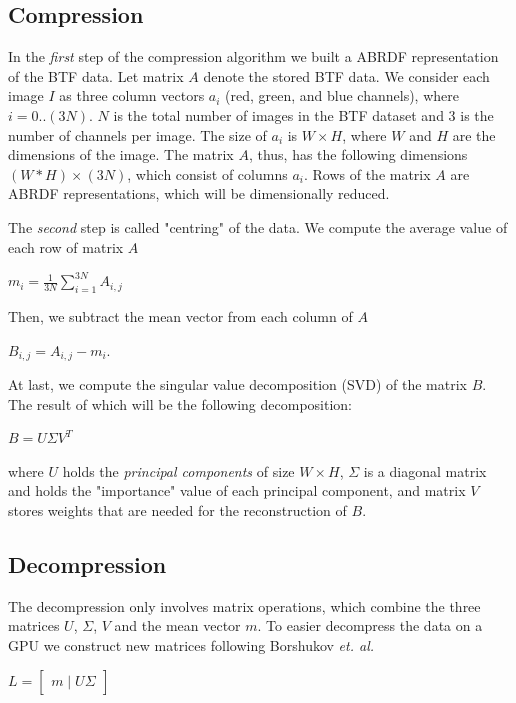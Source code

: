 \subsection{Compression}
\label{section:compression}
In the \emph{first} step of the compression algorithm we built a ABRDF representation of the BTF data.
Let matrix $A$ denote the stored BTF data.
We consider each image $I$ as three column vectors $a_{i}$ (red, green, and blue channels), where $i=0..(3N)$. $N$ is the total number of images in the BTF dataset and 3 is the number of channels per image.
The size of $a_{i}$ is $W\times H$, where $W$ and $H$ are the dimensions of the image.
The matrix $A$, thus, has the following dimensions $(W*H)\times(3N)$, which consist of columns $a_{i}$.
Rows of the matrix $A$ are ABRDF representations, which will be dimensionally reduced.

The  \emph{second} step is called "centring" of the data. We compute the average value of each row of matrix $A$

{\centering $m_i=\frac{1}{3N}\sum_{i=1}^{3N}A_{i,j}$ \\}

Then, we subtract the mean vector from each column of $A$

{\centering $B_{i,j}=A_{i,j}-m_i.$ \\}

At last, we compute the singular value decomposition (SVD) of the matrix $B$. The result of which will be the following decomposition:

{\centering $B=U\Sigma V^{T}$ \\}

where $U$ holds the \emph{principal components} of size $W\times H$, $\Sigma$ is a diagonal matrix and holds the "importance" value of each principal component, and
matrix $V$ stores weights that are needed for the reconstruction of $B$.

\subsection{Decompression}
\label{section:decompression}
The decompression only involves matrix operations, which  combine the three matrices $U$, $\Sigma$, $V$ and the mean vector $m$.
To easier decompress the data on a GPU we construct new matrices following Borshukov  \emph{et. al.} \cite[Ch.\ 15]{gpu_gems}

{\centering $L=\begin{bmatrix}
 m\mid U \Sigma
\end{bmatrix}$ \\}


